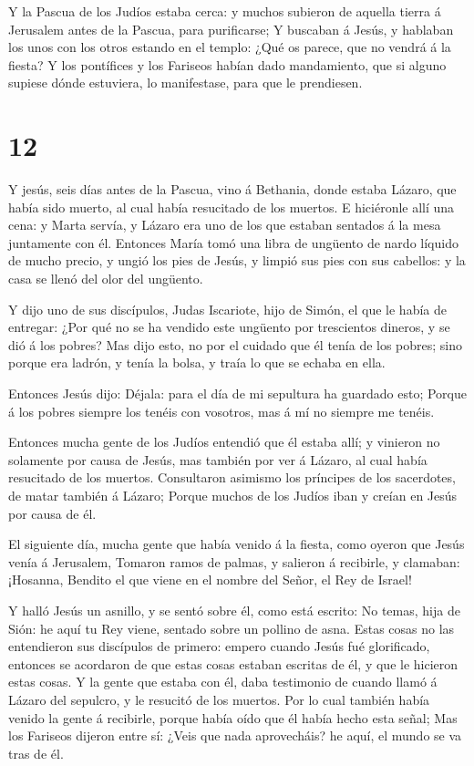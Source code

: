  Y la Pascua de los Judíos estaba cerca: y muchos subieron
de aquella tierra á Jerusalem antes de la Pascua, para purificarse;
 Y buscaban á Jesús, y hablaban los unos con los otros
estando en el templo: ¿Qué os parece, que no vendrá á la fiesta?
 Y los pontífices y los Fariseos habían dado mandamiento,
que si alguno supiese dónde estuviera, lo manifestase, para que le
prendiesen.

\hypertarget{section-11}{%
\section{12}\label{section-11}}

 Y jesús, seis días antes de la Pascua, vino á Bethania,
donde estaba Lázaro, que había sido muerto, al cual había resucitado de
los muertos.  E hiciéronle allí una cena: y Marta servía, y
Lázaro era uno de los que estaban sentados á la mesa juntamente con él.
 Entonces María tomó una libra de ungüento de nardo líquido
de mucho precio, y ungió los pies de Jesús, y limpió sus pies con sus
cabellos: y la casa se llenó del olor del ungüento.

 Y dijo uno de sus discípulos, Judas Iscariote, hijo de
Simón, el que le había de entregar:  ¿Por qué no se ha
vendido este ungüento por trescientos dineros, y se dió á los pobres?
 Mas dijo esto, no por el cuidado que él tenía de los
pobres; sino porque era ladrón, y tenía la bolsa, y traía lo que se
echaba en ella.

 Entonces Jesús dijo: Déjala: para el día de mi sepultura ha
guardado esto;  Porque á los pobres siempre los tenéis con
vosotros, mas á mí no siempre me tenéis.

 Entonces mucha gente de los Judíos entendió que él estaba
allí; y vinieron no solamente por causa de Jesús, mas también por ver á
Lázaro, al cual había resucitado de los muertos. 
Consultaron asimismo los príncipes de los sacerdotes, de matar también á
Lázaro;  Porque muchos de los Judíos iban y creían en Jesús
por causa de él.

 El siguiente día, mucha gente que había venido á la
fiesta, como oyeron que Jesús venía á Jerusalem,  Tomaron
ramos de palmas, y salieron á recibirle, y clamaban: ¡Hosanna, Bendito
el que viene en el nombre del Señor, el Rey de Israel!

 Y halló Jesús un asnillo, y se sentó sobre él, como está
escrito:  No temas, hija de Sión: he aquí tu Rey viene,
sentado sobre un pollino de asna.  Estas cosas no las
entendieron sus discípulos de primero: empero cuando Jesús fué
glorificado, entonces se acordaron de que estas cosas estaban escritas
de él, y que le hicieron estas cosas.  Y la gente que
estaba con él, daba testimonio de cuando llamó á Lázaro del sepulcro, y
le resucitó de los muertos.  Por lo cual también había
venido la gente á recibirle, porque había oído que él había hecho esta
señal;  Mas los Fariseos dijeron entre sí: ¿Veis que nada
aprovecháis? he aquí, el mundo se va tras de él.

